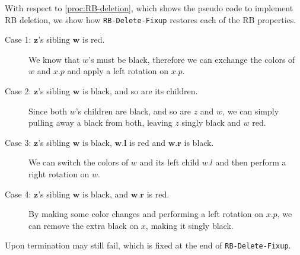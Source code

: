 \documentclass{subfiles}
\begin{document}
    With respect to \autoref{proc:RB-deletion}, which shows the pseudo code to implement RB deletion,
        we show how \lstinline{RB-Delete-Fixup} restores each of the RB properties.
        \begin{description}
            \item [Case 1: \(\mathbf{z}\)'s sibling \(\mathbf{w}\) is red.]
                We know that \(w\)'s must be black, therefore we can exchange the colors of 
                \(w\) and \(x.p\) and apply a left rotation on \(x.p\).

            \item [Case 2: \(\mathbf{z}\)'s sibling \(\mathbf{w}\) is black, and so are its children.]
                Since both \(w\)'s children are black, and so are \(z\) and \(w\),
                we can simply pulling away a black from both, leaving \(z\) singly black and \(w\)
                red.

            \item [Case 3: \(\mathbf{z}\)'s sibling \(\mathbf{w}\) is black,
                \(\mathbf{w.l}\) is red and \(\mathbf{w.r}\) is black.]
                We can switch the colors of \(w\) and its left child \(w.l\)
                    and then perform a right rotation on \(w\).

            \item [Case 4: \(\mathbf{z}\)'s sibling \(\mathbf{w}\) is black, 
                and \(\mathbf{w.r}\) is red.]
                By making some color changes and performing a left rotation on \(x.p\),
                we can remove the extra black on \(x\), making it singly black.
        \end{description}
        Upon termination  may still fail,
            which is fixed at the end of \lstinline{RB-Delete-Fixup}.
            
\end{document}
